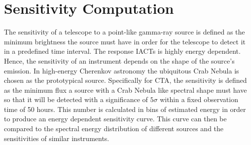 
\section{Sensitivity Computation}
\label{sec:sensitivity_comp}
The sensitivity of a telescope to a point-like gamma-ray source is defined as the minimum brightness the source must have in order for the telescope to detect it 
in a predefined time interval.
The response IACTs is highly energy dependent. Hence, the sensitivity of an instrument depends on the shape of the source's emission.
In high-energy Cherenkov astronomy the ubiquitous Crab Nebula is chosen as the prototypical source.
Specifically for CTA, the sensitivity is defined as the minimum flux a source with a Crab Nebula like spectral shape must have so that it will be detected 
with a significance of $5\sigma$ within a fixed observation time of 50 hours.
This number is calculated in bins of estimated energy in order to produce an energy dependent sensitivity curve.
This curve can then be compared to the spectral energy distribution of different sources and the sensitivities of similar instruments.

